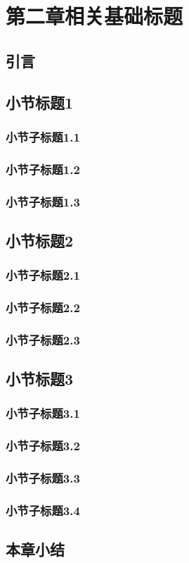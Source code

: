 \chapter{第二章相关基础标题}

\section{引言}

\section{小节标题1}

\subsection{小节子标题1.1}

\subsection{小节子标题1.2}

\subsection{小节子标题1.3}

\section{小节标题2}

\subsection{小节子标题2.1}

\subsection{小节子标题2.2}

\subsection{小节子标题2.3}

\section{小节标题3}

\subsection{小节子标题3.1}

\subsection{小节子标题3.2}

\subsection{小节子标题3.3}

\subsection{小节子标题3.4}

\section{本章小结}


